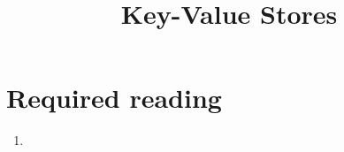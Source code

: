 \documentclass{pgnotes}
\title{Key-Value Stores}
\begin{document}
\maketitle

\section*{Required reading}

\begin{enumerate}
\item \citet[Chapter 8]{perkins:2018:seven}
\end{enumerate}



\end{document}
